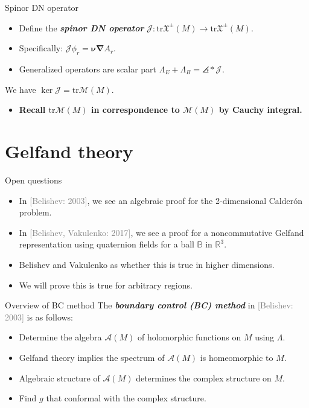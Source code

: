 \documentclass[aspectratio=169,handout]{beamer}
\newcommand\boldgreen[1]{\textcolor{lighter_csu_green}{\emph{\textbf{#1}}}}
\newcommand\boldgold[1]{\textcolor{csu_gold}{\textbf{#1}}}
\newcommand\grey[1]{\textcolor{gray}{#1}}
\newcommand{\trace}{\mathrm{tr}}
\newcommand{\R}{\mathbb{R}}
\newcommand{\algebra}{\mathcal{A}}
\newcommand{\grad}{\boldsymbol{\nabla}}
\newcommand{\monogenics}{\mathcal{M}}
\newcommand{\ball}{\mathbb{B}}
\newcommand{\blade}[1]{\boldsymbol{#1}}
\newcommand{\normal}{\blade{\nu}}
\DeclarePairedDelimiter\angles{\langle}{\rangle}
\newcommand{\proj}[2]{\angles*{#2}_{#1}}
\newcommand{\smoothfields}{\mathfrak{X}}
\begin{document}
\begin{frame}{Spinor DN operator}
\vfill
\begin{itemize}
\pause
\item Define the \boldgreen{spinor DN operator} $\mathcal{J}\colon \trace \smoothfields^\pm(M) \to \trace \smoothfields^\pm(M)$.
\pause
\item Specifically: $\mathcal{J}\phi_r = \normal \grad A_r$.
\pause
\item Generalized operators are scalar part $\Lambda_E+\Lambda_B = \proj{}{\mathcal{J}}$.
\end{itemize}
\pause
\begin{thm*}{}{}
We have $\ker \mathcal{J} = \trace \monogenics(M)$.
\end{thm*}
\begin{itemize}
  \item \boldgold{Recall $\trace \monogenics(M)$ in correspondence to $\monogenics(M)$ by Cauchy integral.}
\end{itemize}
\vfill
\end{frame}

\section{Gelfand theory}

\begin{frame}{Open questions}
\vfill
\begin{itemize}
\pause
    \item In \grey{[Belishev: 2003]}, we see an algebraic proof for the 2-dimensional Calder\'on problem.
\pause
    \item In \grey{[Belishev, Vakulenko: 2017]}, we see a proof for a noncommutative Gelfand representation using quaternion fields for a ball $\ball$ in $\R^3$.
\pause
    \item Belishev and Vakulenko as whether this is true in higher dimensions.
\pause
    \item We will prove this is true for arbitrary regions.
\end{itemize}
\vfill
\end{frame}

\begin{frame}{Overview of BC method}
\vfill
The \boldgreen{boundary control (BC) method} in \grey{[Belishev: 2003]} is as follows:
\begin{itemize}
    \pause
    \item Determine the algebra $\algebra{}(M)$ of holomorphic functions on $M$ using $\Lambda$.
    \pause
    \item Gelfand theory implies the spectrum of $\algebra{}(M)$ is homeomorphic to $M$.
    \pause
    \item Algebraic structure of $\algebra{}(M)$ determines the complex structure on $M$.
    \pause
    \item Find $g$ that conformal with the complex structure.
\end{itemize}
\vfill
\end{frame}
\end{document}
